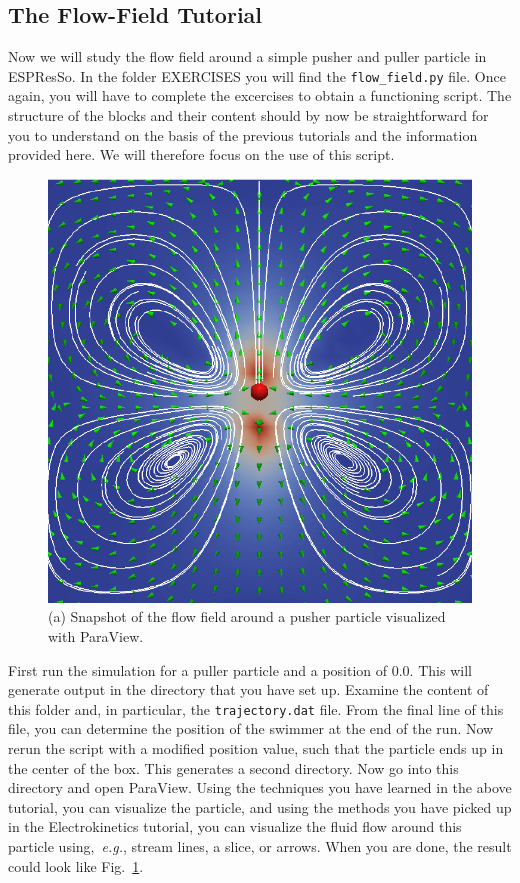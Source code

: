\documentclass[aip,jcp,reprint,a4paper,onecolumn,amsmath]{revtex4-1}
\newcommand\code{\lstinline}
\newcommand{\es}{\mbox{\textsf{ESPResSo}}\xspace}
\begin{document}
\subsection{\label{sub:fftut}The Flow-Field Tutorial}

Now we will study the flow field around a simple pusher and puller particle in \es{}. In the folder EXERCISES you will find the \code{flow_field.py} file. Once again, you will have to complete the excercises to obtain a functioning script. The structure of the blocks and their content should by now be straightforward for you to understand on the basis of the previous tutorials and the information provided here. We will therefore focus on the use of this script.

\begin{figure}[!htb]
\begin{center}
\includegraphics[scale=0.75]{FIGURES/flow_field}
\end{center}
\caption{\label{fig:flow_field}(a) Snapshot of the flow field around a pusher particle visualized with ParaView.}
\end{figure}

First run the simulation for a puller particle and a position of 0.0. This will generate output in the directory that you have set up. Examine the content of this folder and, in particular, the \code{trajectory.dat} file. From the final line of this file, you can determine the position of the swimmer at the end of the run. Now rerun the script with a modified position value, such that the particle ends up in the center of the box. This generates a second directory. Now go into this directory and open ParaView. Using the techniques you have learned in the above tutorial, you can visualize the particle, and using the methods you have picked up in the Electrokinetics tutorial, you can visualize the fluid flow around this particle using,~\textit{e.g.}, stream lines, a slice, or arrows. When you are done, the result could look like Fig.~\ref{fig:flow_field}.
\end{document}
